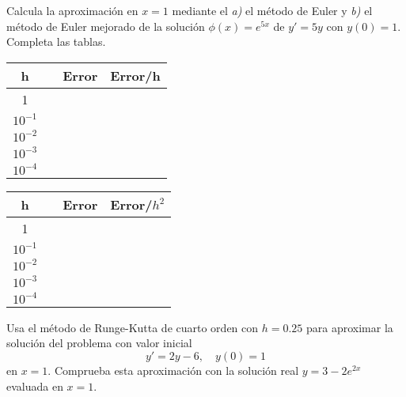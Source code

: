 \documentclass[12pt]{exam}
\begin{document}
\begin{questions}
     \question%
     Calcula la aproximación en $x=1$ mediante el \textit{a)} el método de Euler y \textit{b)} el método de Euler mejorado de la solución $\phi(x)=e^{5x}$ de $y'=5y$ con $y(0)=1$. Completa las tablas.
    
    \small
     \begin{tabular}{cm{2.5cm}cc}
     \hline
     h&\centering{Aproximación de Euler}&Error&Error/h\\
     \hline
     1\\
     $10^{-1}$\\
     $10^{-2}$\\
     $10^{-3}$\\
     $10^{-4}$\\
     \hline
     \end{tabular}
     \begin{tabular}{cm{3cm}cc}
     \hline
     h&\centering{Aproximación de Euler mejorado}&Error&Error/$h^2$\\
     \hline
     1\\
     $10^{-1}$\\
     $10^{-2}$\\
     $10^{-3}$\\
     $10^{-4}$\\
     \hline
     \end{tabular}
     
  
     

     \question%
     Usa el método de Runge-Kutta de cuarto orden con $h=0.25$ para aproximar la solución del problema con valor inicial $$y'=2y-6,\quad y(0)=1$$ en $x=1$. Comprueba esta aproximación con la solución real $y=3-2e^{2x}$ evaluada en $x=1$.
     

     

     
     

     


     

     
     
        \end{questions}
        \vskip30pt
 
 
\end{document}
